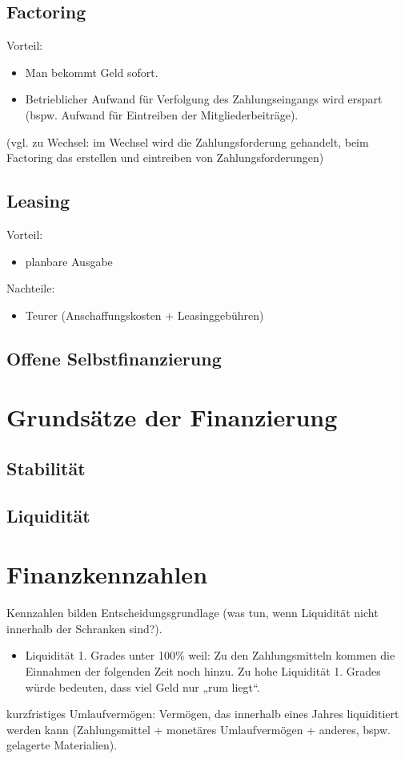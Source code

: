 \subsection{Factoring}
Vorteil:
\begin{itemize}
\item Man bekommt Geld sofort.
\item Betrieblicher Aufwand für Verfolgung des Zahlungseingangs wird erspart (bspw. Aufwand für Eintreiben der Mitgliederbeiträge).
\end{itemize}
(vgl. zu Wechsel: im Wechsel wird die Zahlungsforderung gehandelt, beim Factoring das erstellen und eintreiben von Zahlungsforderungen)

\subsection{Leasing}
Vorteil:
\begin{itemize}
\item planbare Ausgabe
\end{itemize}
Nachteile:
\begin{itemize}
\item Teurer (Anschaffungskosten + Leasinggebühren)
\end{itemize}

\subsection{Offene Selbstfinanzierung}

\section{Grundsätze der Finanzierung}
\subsection{Stabilität}
\subsection{Liquidität}

\section{Finanzkennzahlen}
Kennzahlen bilden Entscheidungsgrundlage (was tun, wenn Liquidität nicht innerhalb der Schranken sind?).
\begin{itemize}
\item Liquidität 1. Grades unter 100\% weil: Zu den Zahlungsmitteln kommen die Einnahmen der folgenden Zeit noch hinzu. Zu hohe Liquidität 1. Grades würde bedeuten, dass viel Geld nur „rum liegt“.
\end{itemize}
kurzfristiges Umlaufvermögen: Vermögen, das innerhalb eines Jahres liquiditiert werden kann (Zahlungsmittel + monetäres Umlaufvermögen + anderes, bspw. gelagerte Materialien).

